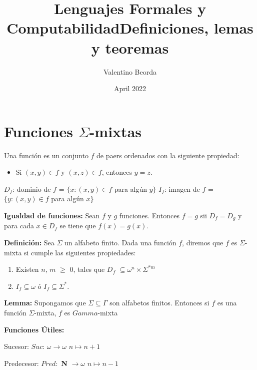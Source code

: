 \documentclass{article}
\title{Lenguajes Formales y Computabilidad\linebreak Definiciones, lemas y teoremas}
\author{Valentino Beorda}
\date{April 2022}
\begin{document}
\maketitle

\section{Funciones $\Sigma$-mixtas}

\begin{flushleft}

Una función es un conjunto $f$ de paers ordenados con la siguiente propiedad:
\begin{itemize}
\item Si $(x, y) \in f$ y $(x, z) \in f$, entonces  $y=z$.
\end{itemize}

$D_f$: dominio de $f$ = $\{x : (x, y) \in f$ para algún $y\}$\linebreak
$I_f$: imagen de $f$ = $\{y : (x, y) \in f$ para algún $x\}$\linebreak

\textbf{Igualdad de funciones:} Sean $f$ y $g$ funciones. Entonces $f = g$ sii $D_f = D_g$ y para cada $x \in D_f$ se tiene que $f(x) = g(x)$.\linebreak

\textbf{Definición:}
Sea $\Sigma$ un alfabeto finito. Dada una función $f$, diremos que $f$ es $\Sigma$-mixta si cumple las siguientes propiedades:
\begin{enumerate}
\item Existen $n$, $m$ $\geq$ 0, tales que $D_f$ $\subseteq \omega^n \times \Sigma^{*m}$
\item $I_f \subseteq \omega$ ó $I_f \subseteq \Sigma^*$.
\end{enumerate}

\textbf{Lemma:} Supongamos que $\Sigma \subseteq \Gamma$ son alfabetos finitos. Entonces si $f$ es una función $\Sigma$-mixta, $f$ es $Gamma$-mixta\linebreak

\textbf {Funciones Útiles:}\linebreak

Sucesor: $Suc$: $\omega \rightarrow \omega$\linebreak
\hspace*{14ex} $n \mapsto n+1$\linebreak

Predecesor: $Pred: $ \textbf{N} $\rightarrow \omega$\linebreak
\hspace*{20ex} $n \mapsto n-1$\linebreak


\end{flushleft}
\end{document}
